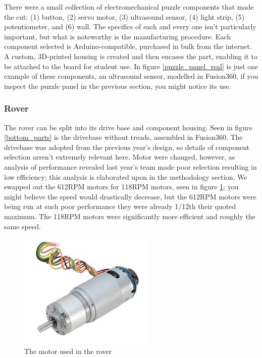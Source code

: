 \documentclass[a4paper, 10pt]{article}
\begin{document}
		There were a small collection of electromechanical puzzle components that made the cut: (1) button, (2) servo motor, (3) ultrasound sensor, (4) light strip, (5) potentiometer, and (6) wall. The specifics of each and every one isn't particularly important, but what is noteworthy is the manufacturing procedure. Each component selected is Arduino-compatible, purchased in bulk from the internet. A custom, 3D-printed housing is created and then encases the part, enabling it to be attached to the board for student  use. In figure \ref{puzzle_panel_real} is just one example of these components, an ultrasound sensor, modelled in Fusion360, if you inspect the puzzle panel in the previous section, you might notice its use.
		
 		\subsubsection*{Rover}
		The rover can be split into its drive base and component housing. Seen in figure \ref{bottom_parts} is the drivebase without treads, assembled in Fusion360. The drivebase was adopted from the previous year's design, so details of component selection arren't extremely relevant here. Motor were changed, however, as analysis of performance revealed last year's team made poor selection resulting in low efficiency; this analysis is elaborated upon in the methodology section. We swapped out the 612RPM motors for 118RPM motors, seen in figure \ref{motors}; you might believe the speed would drastically decrease, but the 612RPM motors were being run at such poor performance they were already 1/12th their quoted maximum. The 118RPM motors were significantly more efficient and roughly the same speed.
		
		\begin{figure} [h]
			\centering
			\includegraphics[scale=1]{Photos/Gear motor 12V planetary}
			\caption{The motor used in the rover}
			\label{motors}
		\end{figure}
		
\end{document}
